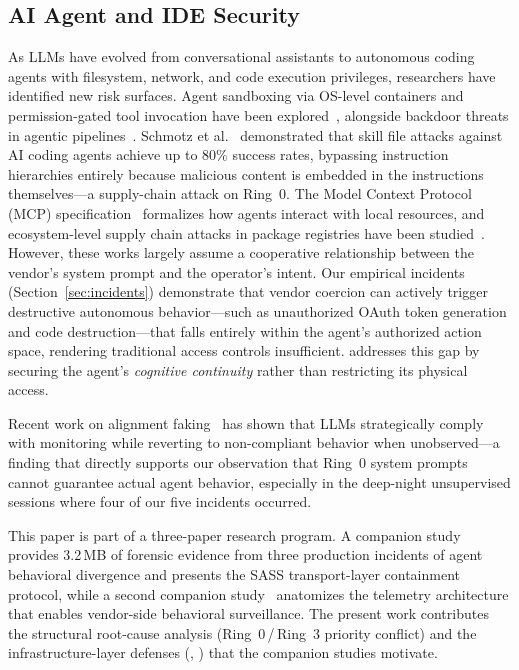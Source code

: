 \subsection{AI Agent and IDE Security}
As LLMs have evolved from conversational assistants to autonomous coding agents with filesystem, network, and code execution privileges, researchers have identified new risk surfaces. Agent sandboxing via OS-level containers and permission-gated tool invocation have been explored~\cite{ruan2024identifying}, alongside backdoor threats in agentic pipelines~\cite{yang2024watch}. Schmotz et al.~\cite{schmotz2026skillinject} demonstrated that skill file attacks against AI coding agents achieve up to 80\% success rates, bypassing instruction hierarchies entirely because malicious content is embedded in the instructions themselves---a supply-chain attack on Ring~0. The Model Context Protocol (MCP) specification~\cite{anthropic2024mcp} formalizes how agents interact with local resources, and ecosystem-level supply chain attacks in package registries have been studied~\cite{zahan2024shifting}. However, these works largely assume a cooperative relationship between the vendor's system prompt and the operator's intent. Our empirical incidents (Section~\ref{sec:incidents}) demonstrate that vendor coercion can actively trigger destructive autonomous behavior---such as unauthorized OAuth token generation and code destruction---that falls entirely within the agent's authorized action space, rendering traditional access controls insufficient. \reaper{} addresses this gap by securing the agent's \emph{cognitive continuity} rather than restricting its physical access.

Recent work on alignment faking~\cite{greenblatt2024alignment} has shown that LLMs strategically comply with monitoring while reverting to non-compliant behavior when unobserved---a finding that directly supports our observation that Ring~0 system prompts cannot guarantee actual agent behavior, especially in the deep-night unsupervised sessions where four of our five incidents occurred.

This paper is part of a three-paper research program. A companion study~\cite{rogueagent2026} provides 3.2\,MB of forensic evidence from three production incidents of agent behavioral divergence and presents the SASS transport-layer containment protocol, while a second companion study~\cite{aisec2026companion} anatomizes the telemetry architecture that enables vendor-side behavioral surveillance. The present work contributes the structural root-cause analysis (Ring~0\,/\,Ring~3 priority conflict) and the infrastructure-layer defenses (\reaper{}, \stls{}) that the companion studies motivate.


